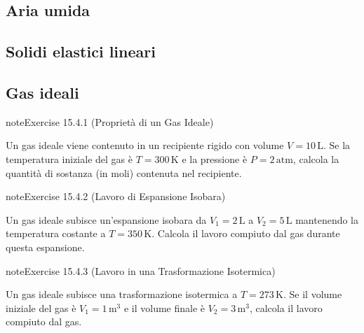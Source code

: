 \documentclass[letterpaper,10pt,italian]{jupyterBook}
\begin{document}
\subsection{Aria umida}
\label{\detokenize{ch/thermodynamics/matter-problems:aria-umida}}

\subsection{Solidi elastici lineari}
\label{\detokenize{ch/thermodynamics/matter-problems:solidi-elastici-lineari}}

\subsection{Gas ideali}
\label{\detokenize{ch/thermodynamics/matter-problems:id1}} \label{exercise:ch/thermodynamics/matter-problems-exercise-0}

\begin{sphinxadmonition}{note}{Exercise 15.4.1 (Proprietà di un Gas Ideale)}



\sphinxAtStartPar
Un gas ideale viene contenuto in un recipiente rigido con volume \(V = 10 \, \text{L}\). Se la temperatura iniziale del gas è \(T = 300 \, \text{K}\) e la pressione è \(P = 2 \, \text{atm}\), calcola la quantità di sostanza (in moli) contenuta nel recipiente.
\end{sphinxadmonition}
 \label{exercise:ch/thermodynamics/matter-problems-exercise-1}

\begin{sphinxadmonition}{note}{Exercise 15.4.2 (Lavoro di Espansione Isobara)}



\sphinxAtStartPar
Un gas ideale subisce un’espansione isobara da \(V_1 = 2 \, \text{L}\) a \(V_2 = 5 \, \text{L}\) mantenendo la temperatura costante a \(T = 350 \, \text{K}\). Calcola il lavoro compiuto dal gas durante questa espansione.
\end{sphinxadmonition}
 \label{exercise:ch/thermodynamics/matter-problems-exercise-2}

\begin{sphinxadmonition}{note}{Exercise 15.4.3 (Lavoro in una Trasformazione Isotermica)}



\sphinxAtStartPar
Un gas ideale subisce una trasformazione isotermica a \(T = 273 \, \text{K}\). Se il volume iniziale del gas è \(V_1 = 1 \, \text{m}^3\) e il volume finale è \(V_2 = 3 \, \text{m}^3\), calcola il lavoro compiuto dal gas.
\end{sphinxadmonition}
 \label{exercise:ch/thermodynamics/matter-problems-exercise-3}
\end{document}
